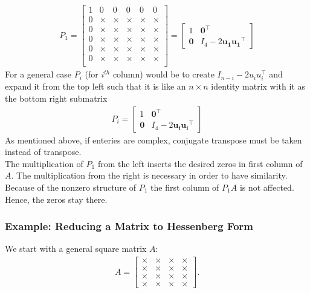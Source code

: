 \documentclass[12pt]{article}
\begin{document}
\begin{align*}
P_1 = \begin{bmatrix}
1 & 0 & 0 & 0 & 0 & 0 \\
0 & \times & \times & \times & \times & \times \\
0 & \times & \times & \times & \times & \times \\
0 & \times & \times & \times & \times & \times \\
0 & \times & \times & \times & \times & \times \\
0 & \times & \times & \times & \times & \times \\
\end{bmatrix} =
\begin{bmatrix}
1 & \mathbf{0}^{\top} \\
\mathbf{0} & I_4 - 2\mathbf{u_1 u_1}^{\top}
\end{bmatrix}
\end{align*}
For a general case $P_i$ (for $i^{th}$ column) would be to create $I_{n-i} - 2u_i u_i^{\top}$ and expand it from the top left such that it is like an $n\times n$ identity matrix with it as the bottom right submatrix
\begin{align*}
    P_i=
\begin{bmatrix}
1 & \mathbf{0}^{\top} \\
\mathbf{0} & I_4 - 2\mathbf{u_i u_i}^{\top}
\end{bmatrix}
\end{align*}
As mentioned above, if enteries are complex, conjugate transpose must be taken instead of transpose.\\
The multiplication of $P_1$ from the left inserts the desired zeros in first column of $A$. The
multiplication from the right is necessary in order to have similarity. Because of the
nonzero structure of $P_1$ the first column of $P_1A$ is not affected. Hence, the zeros stay
there.
\subsubsection{Example: Reducing a Matrix to Hessenberg Form}

We start with a general square matrix \(A\):
\begin{align*}
A = \begin{bmatrix}
\times & \times & \times & \times \\
\times & \times & \times & \times \\
\times & \times & \times & \times \\
\times & \times & \times & \times
\end{bmatrix}.
\end{align*}
\end{document}
